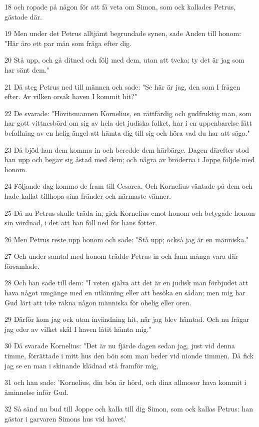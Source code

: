 \par 18 och ropade på någon för att få veta om Simon, som ock kallades Petrus, gästade där.
\par 19 Men under det Petrus alltjämt begrundade synen, sade Anden till honom: "Här äro ett par män som fråga efter dig.
\par 20 Stå upp, och gå ditned och följ med dem, utan att tveka; ty det är jag som har sänt dem."
\par 21 Då steg Petrus ned till männen och sade: "Se här är jag, den som I frågen efter. Av vilken orsak haven I kommit hit?"
\par 22 De svarade: "Hövitsmannen Kornelius, en rättfärdig och gudfruktig man, som har gott vittnesbörd om sig av hela det judiska folket, har i en uppenbarelse fått befallning av en helig ängel att hämta dig till sig och höra vad du har att säga."
\par 23 Då bjöd han dem komma in och beredde dem härbärge. Dagen därefter stod han upp och begav sig åstad med dem; och några av bröderna i Joppe följde med honom.
\par 24 Följande dag kommo de fram till Cesarea. Och Kornelius väntade på dem och hade kallat tillhopa sina fränder och närmaste vänner.
\par 25 Då nu Petrus skulle träda in, gick Kornelius emot honom och betygade honom sin vördnad, i det att han föll ned för hans fötter.
\par 26 Men Petrus reste upp honom och sade: "Stå upp; också jag är en människa."
\par 27 Och under samtal med honom trädde Petrus in och fann många vara där församlade.
\par 28 Och han sade till dem: "I veten själva att det är en judisk man förbjudet att hava något umgänge med en utlänning eller att besöka en sådan; men mig har Gud lärt att icke räkna någon människa för ohelig eller oren.
\par 29 Därför kom jag ock utan invändning hit, när jag blev hämtad. Och nu frågar jag eder av vilket skäl I haven låtit hämta mig."
\par 30 Då svarade Kornelius: "Det är nu fjärde dagen sedan jag, just vid denna timme, förrättade i mitt hus den bön som man beder vid nionde timmen. Då fick jag se en man i skinande klädnad stå framför mig,
\par 31 och han sade: 'Kornelius, din bön är hörd, och dina allmosor hava kommit i åminnelse inför Gud.
\par 32 Så sänd nu bud till Joppe och kalla till dig Simon, som ock kallas Petrus: han gästar i garvaren Simons hus vid havet.'
